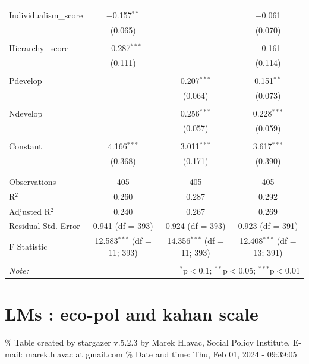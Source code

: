 \documentclass[
]{article}
\begin{document}
\begin{table}[!htbp]
\begin{tabular}{@{\extracolsep{5pt}}lccc}
  & & & \\ 
 Individualism\_score & $-$0.157$^{**}$ &  & $-$0.061 \\ 
  & (0.065) &  & (0.070) \\ 
  & & & \\ 
 Hierarchy\_score & $-$0.287$^{***}$ &  & $-$0.161 \\ 
  & (0.111) &  & (0.114) \\ 
  & & & \\ 
 Pdevelop &  & 0.207$^{***}$ & 0.151$^{**}$ \\ 
  &  & (0.064) & (0.073) \\ 
  & & & \\ 
 Ndevelop &  & 0.256$^{***}$ & 0.228$^{***}$ \\ 
  &  & (0.057) & (0.059) \\ 
  & & & \\ 
 Constant & 4.166$^{***}$ & 3.011$^{***}$ & 3.617$^{***}$ \\ 
  & (0.368) & (0.171) & (0.390) \\ 
  & & & \\ 
\hline \\[-1.8ex] 
Observations & 405 & 405 & 405 \\ 
R$^{2}$ & 0.260 & 0.287 & 0.292 \\ 
Adjusted R$^{2}$ & 0.240 & 0.267 & 0.269 \\ 
Residual Std. Error & 0.941 (df = 393) & 0.924 (df = 393) & 0.923 (df = 391) \\ 
F Statistic & 12.583$^{***}$ (df = 11; 393) & 14.356$^{***}$ (df = 11; 393) & 12.408$^{***}$ (df = 13; 391) \\ 
\hline 
\hline \\[-1.8ex] 
\textit{Note:}  & \multicolumn{3}{r}{$^{*}$p$<$0.1; $^{**}$p$<$0.05; $^{***}$p$<$0.01} \\ 
\end{tabular} 
\end{table} 
\endgroup

\newpage

\hypertarget{lms-eco-pol-and-kahan-scale}{%
\section{LMs : eco-pol and kahan
scale}\label{lms-eco-pol-and-kahan-scale}}

\begingroup\setlength{\tabcolsep}{1pt}

\renewcommand{\arraystretch}{0.7}

\% Table created by stargazer v.5.2.3 by Marek Hlavac, Social Policy
Institute. E-mail: marek.hlavac at gmail.com \% Date and time: Thu, Feb
01, 2024 - 09:39:05
\end{document}
